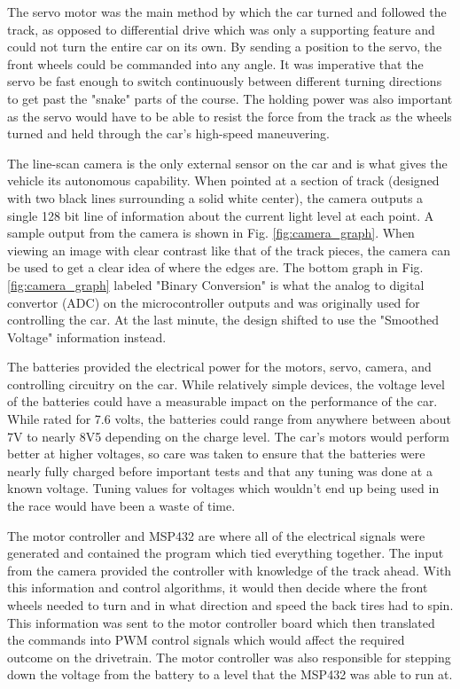 \documentclass[conference]{IEEEtran}
\begin{document}
    The servo motor was the main method by which the car turned and followed
    the track, as opposed to differential drive which was only a supporting
    feature and could not turn the entire car on its own. By sending a
    position to the servo, the front wheels could be commanded into any angle.
    It was imperative that the servo be fast enough to switch continuously
    between different turning directions to get past the "snake" parts of the
    course. The holding power was also important as the servo would have to be
    able to resist the force from the track as the wheels turned and held
    through the car's high-speed maneuvering.

    The line-scan camera is the only external sensor on the car and is what
    gives the vehicle its autonomous capability. When pointed at a section of
    track (designed with two black lines surrounding a solid white center),
    the camera outputs a single 128 bit line of information about the current
    light level at each point. A sample output from the camera is shown in
    Fig. \ref{fig:camera_graph}. When viewing an image with clear contrast
    like that of the track pieces, the camera can be used to get a clear idea
    of where the edges are. The bottom graph in Fig. \ref{fig:camera_graph}
    labeled "Binary Conversion" is what the analog to digital convertor (ADC)
    on the microcontroller outputs and was originally used for controlling the
    car. At the last minute, the design shifted to use the "Smoothed Voltage"
    information instead.

    The batteries provided the electrical power for the motors, servo, camera,
    and controlling circuitry on the car. While relatively simple devices, the
    voltage level of the batteries could have a measurable impact on the
    performance of the car. While rated for 7.6 volts, the batteries could
    range from anywhere between about 7V to nearly 8V5 depending on the charge
    level. The car's motors would perform better at higher voltages, so care
    was taken to ensure that the batteries were nearly fully charged before
    important tests and that any tuning was done at a known voltage. Tuning
    values for voltages which wouldn't end up being used in the race would
    have been a waste of time.
    
    The motor controller and MSP432 are where all of the electrical signals
    were generated and contained the program which tied everything together.
    The input from the camera provided the controller with knowledge of the
    track ahead. With this information and control algorithms, it would then
    decide where the front wheels needed to turn and in what direction and
    speed the back tires had to spin. This information was sent to the motor
    controller board which then translated the commands into PWM control
    signals which would affect the required outcome on the drivetrain. The
    motor controller was also responsible for stepping down the voltage from
    the battery to a level that the MSP432 was able to run at.
\end{document}

